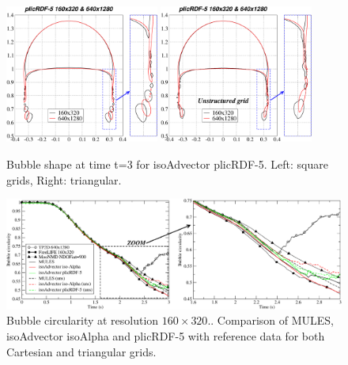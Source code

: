 \documentclass[review]{elsarticle}
\begin{document}
\begin{figure}[!h]
\begin{center}
 \includegraphics[width=0.45\textwidth]{figures/bubble_shape_t=3_plicRDF5-struct.pdf}
 \hspace{2mm}
 \includegraphics[width=0.45\textwidth]{figures/bubble_shape_t=3_plicRDF5-uns.pdf}
 \vspace{-6mm}
\end{center}
\caption{Bubble shape at time t=3 for isoAdvector plicRDF-5. Left: square grids, Right: triangular.}
\label{fig:HB_bubble_shape_3_plicRDF5}
\end{figure}


\begin{figure}[!h]
  \includegraphics[width=\textwidth]{figures/HysingB_bubble_circularity_160x320.pdf}
  \caption{Bubble circularity at resolution $160\times320.$. Comparison of MULES, isoAdvector isoAlpha and plicRDF-5 with reference data for both Cartesian and triangular grids.}
  \label{fig:HB_bubble_circularity160}
\end{figure}
\end{document}
